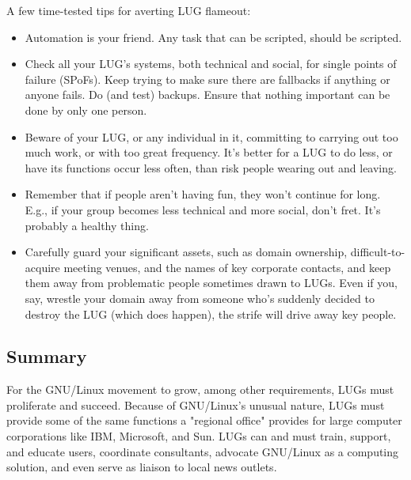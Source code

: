 A few time-tested tips for averting LUG flameout:

\begin{itemize}
\item Automation is your friend.  Any task that can be scripted, 
should be scripted.
\item Check all your LUG's systems, both technical and social,
for single points of failure (SPoFs).  Keep trying to make sure there are
fallbacks if anything or anyone fails.  Do (and test) backups.  Ensure that nothing
important can be done by only one person.
\item Beware of your LUG, or any individual in it, committing 
to carrying out too much work, or with too great frequency.  It's 
better for a LUG to do less, or have its functions occur less often,
than risk people wearing out and leaving.
\item Remember that if people aren't having fun, they won't 
continue for long.  E.g., if your group becomes less technical and 
more social, don't fret.  It's probably a healthy thing.
\item Carefully guard your significant assets, such as domain
ownership, difficult-to-acquire meeting venues, and the names of key
corporate contacts, and keep them away from problematic people sometimes
drawn to LUGs.  Even if you, say, wrestle your domain away from someone
who's suddenly decided to destroy the LUG (which does happen), the
strife will drive away key people.
\end{itemize}

\subsection{Summary}

For the GNU/Linux movement to grow, among other requirements,
LUGs must proliferate and succeed.  Because of GNU/Linux's
unusual nature, LUGs must provide some of the same functions a "regional
office" provides for large computer corporations like IBM, Microsoft,
and Sun. LUGs can and must train, support, and educate users,
coordinate consultants, advocate GNU/Linux as a computing solution,
and even serve as liaison to local news outlets.

